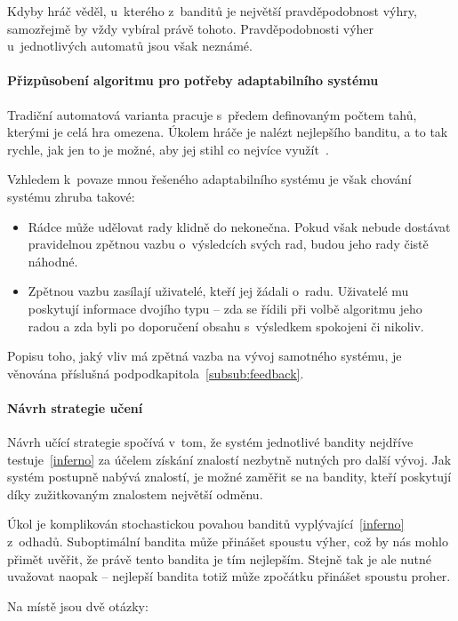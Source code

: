 \documentclass[thesis=M,czech]{FITthesis}[2014/05/07]
\begin{document}
Kdyby hráč věděl, u~kterého z~banditů je největší pravděpodobnost výhry, samozřejmě by vždy vybíral právě tohoto. Pravděpodobnosti výher u~jednotlivých automatů jsou však neznámé.

\paragraph{Přizpůsobení algoritmu pro potřeby adaptabilního systému}
Tradiční automatová varianta pracuje s~předem definovaným počtem tahů, kterými je celá hra omezena. Úkolem hráče je nalézt nejlepšího banditu, a to tak rychle, jak jen to je možné, aby jej stihl co nejvíce využít~\cite{camdp}.

Vzhledem k~povaze mnou řešeného adaptabilního systému je však chování systému zhruba takové:

\begin{itemize}
	\item Rádce může udělovat rady klidně do nekonečna. Pokud však nebude dostávat pravidelnou zpětnou vazbu o~výsledcích svých rad, budou jeho rady čistě náhodné.
	\item Zpětnou vazbu zasílají uživatelé, kteří jej žádali o~radu. Uživatelé mu poskytují informace dvojího typu – zda se řídili při volbě algoritmu jeho radou a zda byli po doporučení obsahu s~výsledkem spokojeni či nikoliv.  
\end{itemize}

Popisu toho, jaký vliv má zpětná vazba na vývoj samotného systému, je věnována příslušná podpodkapitola~\ref{subsub:feedback}.

\paragraph{Návrh strategie učení}
	
Návrh učící strategie spočívá v~tom, že systém jednotlivé bandity nejdříve testuje~\ref{inferno} za účelem získání znalostí nezbytně nutných pro další vývoj. Jak systém postupně nabývá znalostí, je možné zaměřit se na bandity, kteří poskytují díky zužitkovaným znalostem největší odměnu. 

Úkol je komplikován stochastickou povahou banditů vyplývající~\ref{inferno} z~odhadů. Suboptimální bandita může přinášet spoustu výher, což by nás mohlo přimět uvěřit, že právě tento bandita je tím nejlepším. Stejně tak je ale nutné uvažovat naopak – nejlepší bandita totiž může zpočátku přinášet spoustu proher.

Na místě jsou dvě otázky:
\end{document}
